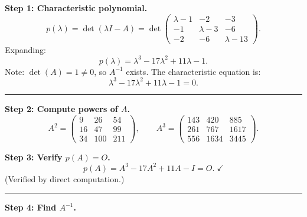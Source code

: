 \documentclass[12pt,a3paper]{article}
\begin{document}
\begin{tcolorbox}[enhanced,breakable,
  colback=cE!4,colframe=cE,boxrule=0.8pt,arc=5pt,
  title={\textbf{Answer --- Cayley-Hamilton \& Inverse for
    $A=\begin{pmatrix}1&2&3\\1&3&6\\2&6&13\end{pmatrix}$}},
  fonttitle=\bfseries\color{white},colbacktitle=cE]

\textbf{Step 1: Characteristic polynomial.}
\[
  p(\lambda) = \det(\lambda I - A)
  = \det\begin{pmatrix}\lambda-1&-2&-3\\-1&\lambda-3&-6\\-2&-6&\lambda-13\end{pmatrix}.
\]
Expanding:
\[
  p(\lambda) = \lambda^3 - 17\lambda^2 + 11\lambda - 1.
\]
Note: $\det(A) = 1 \neq 0$, so $A^{-1}$ exists.
The characteristic equation is:
\[
  \lambda^3 - 17\lambda^2 + 11\lambda - 1 = 0.
\]

\medskip\textcolor{cE}{\rule{\textwidth}{0.4pt}}

\textbf{Step 2: Compute powers of $A$.}
\[
  A^2 = \begin{pmatrix}9&26&54\\16&47&99\\34&100&211\end{pmatrix}, \qquad
  A^3 = \begin{pmatrix}143&420&885\\261&767&1617\\556&1634&3445\end{pmatrix}.
\]

\textbf{Step 3: Verify $p(A) = O$.}
\[
  p(A) = A^3 - 17A^2 + 11A - I = O.\;\checkmark
\]
(Verified by direct computation.)

\medskip\textcolor{cE}{\rule{\textwidth}{0.4pt}}

\textbf{Step 4: Find $A^{-1}$.}


\end{tcolorbox}
\end{document}
